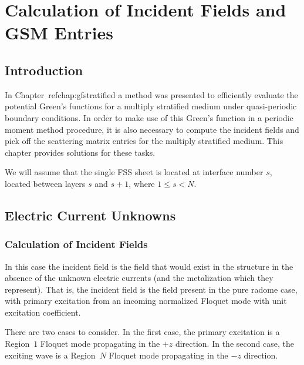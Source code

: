 \chapter{Calculation of Incident Fields and GSM Entries}
\label{chap:incgsm}

\section{Introduction}


In Chapter~ref{chap:gfstratified} a method was presented to efficiently evaluate the
potential Green's functions for a multiply stratified medium under
quasi-periodic boundary conditions.  In order to make use of this
Green's function in a periodic moment method procedure, it is also
necessary to compute the incident fields and pick off the scattering
matrix entries for the multiply stratified medium.  This chapter provides
solutions for these tasks.

We will assume that the single FSS sheet is located at interface
number $s$, located between layers $s$ and $s+1$, where $1 \leq s < N.$

\section{Electric Current Unknowns}
\subsection{Calculation of Incident Fields}
In this case the incident field is the field that would exist in the
 structure in the absence of the unknown electric currents (and the
 metalization which they represent). That is, the incident field is
 the field present in the pure radome case, with primary excitation
 from an incoming normalized Floquet mode with unit excitation
 coefficient.

 There are two cases to consider.  In the first case, the primary excitation
 is a Region~$1$ Floquet mode propagating in the $+z$ direction.  
 In the second case, the exciting wave is a Region~$N$ Floquet mode
 propagating in the  $-z$ direction.


